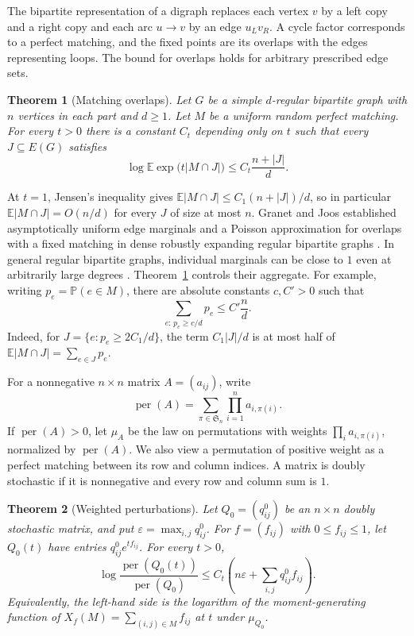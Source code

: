 \documentclass[11pt]{article}
\DeclareMathOperator{\per}{per}
\newcommand{\E}{\mathbb{E}}
\newcommand{\PP}{\mathbb{P}}
\newtheorem{theorem}{Theorem}[section]
\begin{document}
The bipartite representation of a digraph replaces each vertex \(v\) by a left copy and a right copy and each arc \(u\to v\) by an edge \(u_Lv_R\). A cycle factor corresponds to a perfect matching, and the fixed points are its overlaps with the edges representing loops. The bound for overlaps holds for arbitrary prescribed edge sets.

\begin{theorem}[Matching overlaps]\label{thm:overlap}
Let \(G\) be a simple \(d\)-regular bipartite graph with \(n\) vertices in each part and \(d\ge 1\). Let \(M\) be a uniform random perfect matching. For every \(t>0\) there is a constant \(C_t\) depending only on \(t\) such that every \(J\subseteq E(G)\) satisfies
\[
 \log \E \exp\bigl(t|M\cap J|\bigr)
 \le C_t\frac{n+|J|}{d}.
\]
\end{theorem}

At \(t=1\), Jensen's inequality gives \(\E |M\cap J|\le C_1(n+|J|)/d\), so in particular \(\E |M\cap J|=O(n/d)\) for every \(J\) of size at most \(n\). Granet and Joos established asymptotically uniform edge marginals and a Poisson approximation for overlaps with a fixed matching in dense robustly expanding regular bipartite graphs \cite[Theorem~3.3]{GranetJoos}. In general regular bipartite graphs, individual marginals can be close to \(1\) even at arbitrarily large degrees \cite[Theorem~1.7]{ACFK}. Theorem~\ref{thm:overlap} controls their aggregate. For example, writing \(p_e=\PP(e\in M)\), there are absolute constants \(c,C'>0\) such that
\begin{equation}\label{eq:large-marginals}
 \sum_{e:\,p_e\ge c/d}p_e\le C'\frac{n}{d}.
\end{equation}
Indeed, for \(J=\{e:p_e\ge 2C_1/d\}\), the term \(C_1|J|/d\) is at most half of \(\E |M\cap J|=\sum_{e\in J}p_e\).

For a nonnegative \(n\times n\) matrix \(A=(a_{ij})\), write
\[
 \per(A)=\sum_{\pi\in\mathfrak S_n}\prod_{i=1}^n a_{i,\pi(i)}.
\]
If \(\per(A)>0\), let \(\mu_A\) be the law on permutations with weights \(\prod_i a_{i,\pi(i)}\), normalized by \(\per(A)\). We also view a permutation of positive weight as a perfect matching between its row and column indices. A matrix is doubly stochastic if it is nonnegative and every row and column sum is \(1\).

\begin{theorem}[Weighted perturbations]\label{thm:weighted}
Let \(Q_0=(q^0_{ij})\) be an \(n\times n\) doubly stochastic matrix, and put \(\varepsilon=\max_{i,j}q^0_{ij}\). For \(f=(f_{ij})\) with \(0\le f_{ij}\le 1\), let \(Q_0(t)\) have entries \(q^0_{ij}e^{t f_{ij}}\). For every \(t>0\),
\begin{equation}\label{eq:weighted}
 \log\frac{\per(Q_0(t))}{\per(Q_0)}
 \le C_t\left(n\varepsilon+\sum_{i,j}q^0_{ij}f_{ij}\right).
\end{equation}
Equivalently, the left-hand side is the logarithm of the moment-generating function of \(X_f(M)=\sum_{(i,j)\in M}f_{ij}\) at \(t\) under \(\mu_{Q_0}\).
\end{theorem}
\end{document}
